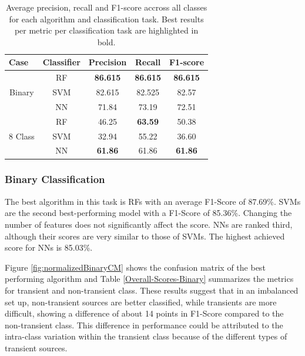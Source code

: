 \documentclass[usenatbib]{mnras}
\begin{document}
\begin{table}
\centering
\begin{tabular}{ccccc}
\hline
\multicolumn{1}{l}{\textbf{Case}} & \textbf{Classifier} & \textbf{Precision} & \textbf{Recall} & \textbf{F1-score} \\ \hline \hline
\multirow{3}{*}{Binary}                 & RF                  & \textbf{86.615}    & \textbf{86.615} & \textbf{86.615}   \\
                                        & SVM                 & 82.615             & 82.525          & 82.57             \\
                                        & NN                  & 71.84              & 73.19           & 72.51             \\ \hline
\multirow{3}{*}{8 Class}                & RF                  & 46.25              & \textbf{63.59}  & 50.38             \\
                                        & SVM                 & 32.94              & 55.22           & 36.60             \\
                                        & NN                  & \textbf{61.86}     & 61.86           & \textbf{61.86}   \\ \hline
\end{tabular}%
\caption{Average precision, recall and F1-score accross all classes for each algorithm and classification task. Best results per metric per classification task are highlighted in bold.}
\label{table:all-avg-results}
\end{table}

\subsubsection{Binary Classification} 
\label{Results-Binary} 

The best algorithm in this task is RFs with an average F1-Score of
87.69\%.   
SVMs are the second best-performing model with a F1-Score of 85.36\%. 
Changing the number of features does not significantly affect the score.
NNs are ranked third, although their scores are very similar to those of SVMs. 
The highest achieved score for NNs is 85.03\%.

Figure \ref{fig:normalizedBinaryCM} shows the confusion matrix of the best
performing algorithm and Table \ref{Overall-Scores-Binary} summarizes 
the metrics for transient and non-transient class. These results suggest 
that in an imbalanced set up, non-transient sources are better classified, 
while transients are more difficult, showing a difference of about 
14 points in F1-Score compared to the non-transient class. 
This difference in performance could be attributed to the intra-class
variation within the transient class because of the different 
types of transient sources.  
\end{document}
